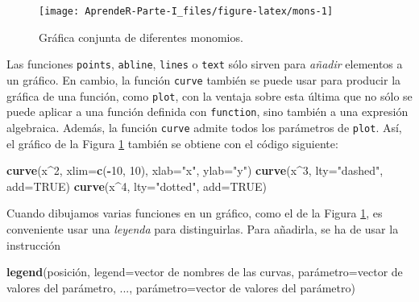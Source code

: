 \documentclass[]{book}
\newenvironment{Shaded}{\begin{snugshade}}{\end{snugshade}}
\newcommand{\DataTypeTok}[1]{\textcolor[rgb]{0.13,0.29,0.53}{#1}}
\newcommand{\DecValTok}[1]{\textcolor[rgb]{0.00,0.00,0.81}{#1}}
\newcommand{\KeywordTok}[1]{\textcolor[rgb]{0.13,0.29,0.53}{\textbf{#1}}}
\newcommand{\NormalTok}[1]{#1}
\newcommand{\OperatorTok}[1]{\textcolor[rgb]{0.81,0.36,0.00}{\textbf{#1}}}
\newcommand{\OtherTok}[1]{\textcolor[rgb]{0.56,0.35,0.01}{#1}}
\newcommand{\StringTok}[1]{\textcolor[rgb]{0.31,0.60,0.02}{#1}}
\theoremstyle{definition}
\theoremstyle{definition}
\theoremstyle{definition}
\theoremstyle{remark}
\begin{document}
\begin{figure}

{\centering \texttt{[image: AprendeR-Parte-I\_files/figure-latex/mons-1]} 

}

\caption{Gráfica conjunta de diferentes monomios.}\label{fig:mons}
\end{figure}

Las funciones \texttt{points}, \texttt{abline}, \texttt{lines} o \texttt{text} sólo sirven para \emph{añadir} elementos a un gráfico. En cambio, la función \texttt{curve} también se puede usar para producir la gráfica de una función, como \texttt{plot}, con la ventaja sobre esta última que no sólo se puede aplicar a una función definida con \texttt{function}, sino también a una expresión algebraica. Además, la función \texttt{curve} admite todos los parámetros de \texttt{plot}. Así, el gráfico de la Figura \ref{fig:mons} también se obtiene con el código siguiente:

\begin{Shaded}
\begin{Highlighting}[]
\KeywordTok{curve}\NormalTok{(x}\OperatorTok{^}\DecValTok{2}\NormalTok{, }\DataTypeTok{xlim=}\KeywordTok{c}\NormalTok{(}\OperatorTok{-}\DecValTok{10}\NormalTok{, }\DecValTok{10}\NormalTok{), }\DataTypeTok{xlab=}\StringTok{"x"}\NormalTok{, }\DataTypeTok{ylab=}\StringTok{"y"}\NormalTok{)}
\KeywordTok{curve}\NormalTok{(x}\OperatorTok{^}\DecValTok{3}\NormalTok{, }\DataTypeTok{lty=}\StringTok{"dashed"}\NormalTok{, }\DataTypeTok{add=}\OtherTok{TRUE}\NormalTok{)}
\KeywordTok{curve}\NormalTok{(x}\OperatorTok{^}\DecValTok{4}\NormalTok{, }\DataTypeTok{lty=}\StringTok{"dotted"}\NormalTok{, }\DataTypeTok{add=}\OtherTok{TRUE}\NormalTok{) }
\end{Highlighting}
\end{Shaded}

Cuando dibujamos varias funciones en un gráfico, como el de la Figura \ref{fig:mons}, es conveniente usar una \emph{leyenda} para distinguirlas. Para añadirla, se ha de usar la instrucción

\begin{Shaded}
\begin{Highlighting}[]
\KeywordTok{legend}\NormalTok{(posición, }\DataTypeTok{legend=}\NormalTok{vector de nombres de las curvas, }
\NormalTok{       pará}\DataTypeTok{metro=}\NormalTok{vector de  valores del parámetro, ..., }
\NormalTok{       pará}\DataTypeTok{metro=}\NormalTok{vector de  valores del parámetro)}
\end{Highlighting}
\end{Shaded}
\end{document}
